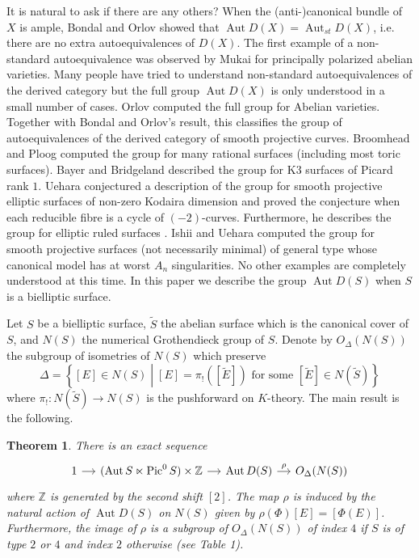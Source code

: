 \documentclass[a4paper, 12pt, twoside]{amsart}
\theoremstyle{plain}
\newtheorem{theorem}{Theorem}[section]
\theoremstyle{definition}
\DeclareMathOperator{\Pic}{Pic}
\DeclareMathOperator{\Aut}{Aut}
\begin{document}
It is natural to ask if there are any others? When the
(anti-)canonical bundle of $X$ is ample, Bondal and Orlov
\cite{MR1818984} showed that $\Aut D(X) = \Aut_{st} D(X)$, i.e. there
are no extra autoequivalences of $D(X)$. The first example of a
non-standard autoequivalence was observed by Mukai \cite{MR607081} for
principally polarized abelian varieties. Many people have tried to
understand non-standard autoequivalences of the derived category but
the full group $\Aut D(X)$ is only understood in a small number of
cases. Orlov \cite{MR1921811} computed the full group for Abelian
varieties. Together with Bondal and Orlov's result, this classifies
the group of autoequivalences of the derived category of smooth
projective curves. Broomhead and Ploog \cite{MR3162236} computed the
group for many rational surfaces (including most toric
surfaces). Bayer and Bridgeland \cite{2013arXiv1310.8266B} described
the group for K$3$ surfaces of Picard rank $1$. Uehara
\cite{2015arXiv150106657U} conjectured a description of the group for
smooth projective elliptic surfaces of non-zero Kodaira dimension and
proved the conjecture when each reducible fibre is a cycle of
$(-2)$-curves. Furthermore, he describes the group for elliptic ruled
surfaces \cite{2015arXiv151106031U}. Ishii and Uehara \cite{MR2198807}
computed the group for smooth projective surfaces (not necessarily
minimal) of general type whose canonical model has at worst $A_n$
singularities. No other examples are completely understood at this
time. In this paper we describe the group $\Aut D(S)$ when $S$ is a
bielliptic surface.  \newline

Let $S$ be a bielliptic surface, $\widetilde{S}$ the abelian surface
which is the canonical cover of $S$, and $N(S)$ the numerical
Grothendieck group of $S$. Denote by $O_{\Delta}(N(S))$ the subgroup
of isometries of $N(S)$ which preserve
\[
  \Delta = \left\{ [E] \in N(S) \middle| [E] = \pi_!([\widetilde{E}])
    \text{ for some } [\widetilde{E}] \in N(\widetilde{S}) \right\}
\]
where $\pi_! \colon N(\widetilde{S}) \to N(S)$ is the pushforward on
$K$-theory. The main result is the following.

\begin{theorem}\label{thm:main}
  There is an exact sequence
  \begin{equation*}
    \begin{tikzcd}[column sep=small]
      1 \arrow{r} & (\Aut S \ltimes \Pic^0 S) \times \mathbb{Z}
      \arrow{r} & \Aut D(S) \arrow{r}{\rho} & O_{\Delta}(N(S))
    \end{tikzcd}
  \end{equation*}
  where $\mathbb{Z}$ is generated by the second shift $[2]$. The map
  $\rho$ is induced by the natural action of $\Aut D(S)$ on $N(S)$
  given by $\rho(\Phi)[E] = [\Phi(E)]$. Furthermore, the image of
  $\rho$ is a subgroup of $O_{\Delta}(N(S))$ of index $4$ if $S$ is of
  type $2$ or $4$ and index $2$ otherwise (see Table
  1).
\end{theorem}
\end{document}
